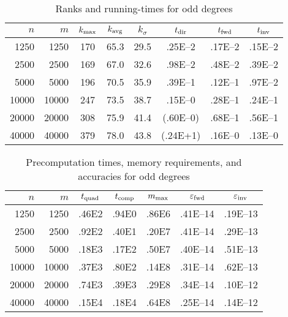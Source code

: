 \documentclass[final,3p,times]{elsarticle}
\def\epsilon{\varepsilon}
\begin{document}
\newpage


\begin{table}[h]
\caption{Ranks and running-times for odd degrees}
\label{odds_time}
\vspace{1em}
\begin{tabular*}{\columnwidth}{@{\extracolsep{\fill}}rrcccccc}
$n$ &   $m$ & $k_{\rm max}$ & $k_{\rm avg}$ & $k_{\sigma}$ & $t_{\rm dir}$ & $t_{\rm fwd}$ & $t_{\rm inv}$ \\\hline
 1250 &  1250 &           170 &          65.3 &         29.5 &       .25E--2 &       .17E--2 &       .15E--2 \\\hline
 2500 &  2500 &           169 &          67.0 &         32.6 &       .98E--2 &       .48E--2 &       .39E--2 \\\hline
 5000 &  5000 &           196 &          70.5 &         35.9 &       .39E--1 &       .12E--1 &       .97E--2 \\\hline
10000 & 10000 &           247 &          73.5 &         38.7 &       .15E--0 &       .28E--1 &       .24E--1 \\\hline
20000 & 20000 &           308 &          75.9 &         41.4 &      (.60E--0)&       .68E--1 &       .56E--1 \\\hline
40000 & 40000 &           379 &          78.0 &         43.8 &       (.24E+1)&       .16E--0 &       .13E--0 \\\hline
\end{tabular*}
\end{table}


\begin{table}[h]
\caption{Precomputation times, memory requirements, and accuracies
         for odd degrees}
\label{odds_pre}
\vspace{1em}
\begin{tabular*}{\columnwidth}{@{\extracolsep{\fill}}rrccccc}
$n$ &   $m$ & $t_{\rm quad}$ & $t_{\rm comp}$ & $m_{\rm max}$ & $\epsilon_{\rm fwd}$ & $\epsilon_{\rm inv}$ \\\hline
 1250 &  1250 &          .46E2 &          .94E0 &         .86E6 &             .41E--14 &             .19E--13 \\\hline
 2500 &  2500 &          .92E2 &          .40E1 &         .20E7 &             .41E--14 &             .29E--13 \\\hline
 5000 &  5000 &          .18E3 &          .17E2 &         .50E7 &             .40E--14 &             .51E--13 \\\hline
10000 & 10000 &          .37E3 &          .80E2 &         .14E8 &             .31E--14 &             .62E--13 \\\hline
20000 & 20000 &          .74E3 &          .39E3 &         .29E8 &             .34E--14 &             .10E--12 \\\hline
40000 & 40000 &          .15E4 &          .18E4 &         .64E8 &             .25E--14 &             .14E--12 \\\hline
\end{tabular*}
\end{table}
\end{document}
